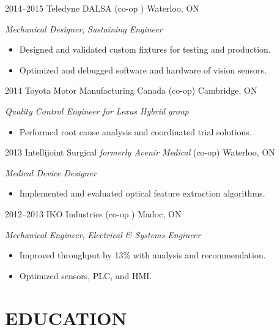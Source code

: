 \documentclass[a4paper,nocolors]{cv-friggeri-ben}
\begin{document}
\begin{entrylist}
\entry
    {2014--2015}
    {Teledyne DALSA {\normalfont (co-op )}}
    {Waterloo, ON}
    {\emph{Mechanical Designer}, \emph{Sustaining Engineer}
    \begin{itemize}
        \item Designed and validated custom fixtures for testing and production.
        \item Optimized and debugged software and hardware of vision sensors.
    \end{itemize}}

\entry
    {2014}
    {Toyota Motor Manufacturing Canada {\normalfont (co-op)}}
    {Cambridge, ON}
    {\emph{Quality Control Engineer for Lexus Hybrid group}
    \begin{itemize}
        \item Performed root cause analysis and coordinated trial solutions.
    \end{itemize}}

\entry
    {2013}
    {Intellijoint Surgical {\normalfont \emph{formerly Avenir Medical} (co-op)}}
    {Waterloo, ON}
    {\emph{Medical Device Designer}
    \begin{itemize}
        \item Implemented and evaluated optical feature extraction algorithms.
    \end{itemize}}

\entry
    {2012--2013}
    {IKO Industries {\normalfont (co-op )}}
    {Madoc, ON}
    {\emph{Mechanical Engineer}, \emph{Electrical \& Systems Engineer}
    \begin{itemize}
        \item Improved throughput by 13\% with analysis and recommendation.
        \item Optimized sensors, PLC, and HMI.
    \end{itemize}
    }
\end{entrylist}



\section{EDUCATION}
\end{document}
